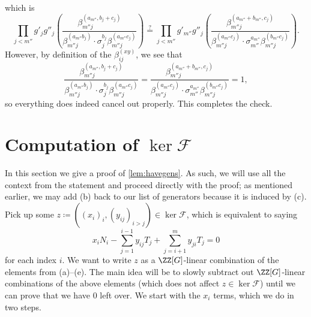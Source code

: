 \documentclass{article}
\numberwithin{equation}{section}
\begin{document}
which is
\[\prod_{j<m''}
g'_jg''_j\left(\frac{\beta_{m''j}^{(a_{m''},b_j+c_j)}}
{\beta_{m''j}^{(a_{m''}b_j)}\cdot
\sigma_j^{b_j}\beta_{m''j}^{(a_{m''}c_j)}}\right)
\stackrel?=\prod_{j<m''}
g'_{m''}g''_j\left(\frac{\beta_{m''j}^{(a_{m''}+b_{m''},c_j)}}
{\beta_{m''j}^{(a_{m''}c_j)}\cdot
\sigma_{m''}^{a_{m''}}\beta_{m''j}^{(b_{m''}c_j)}}\right).\]
However, by definition of the $\beta_{ij}^{(xy)}$, we see that
\[\frac{\beta_{m''j}^{(a_{m''},b_j+c_j)}}
{\beta_{m''j}^{(a_{m''}b_j)}\cdot
\sigma_j^{b_j}\beta_{m''j}^{(a_{m''}c_j)}}=\frac{\beta_{m''j}^{(a_{m''}+b_{m''},c_j)}}
{\beta_{m''j}^{(a_{m''}c_j)}\cdot
\sigma_{m''}^{a_{m''}}\beta_{m''j}^{(b_{m''}c_j)}}=1,\]
so everything does indeed cancel out properly. This completes the check.

\section{Computation of \texorpdfstring{$\ker\mathcal F$}{ker F}} \label{sec:havegensproof}
In this section we give a proof of \autoref{lem:havegens}. As such, we will use all the context from the statement and proceed directly with the proof; as mentioned earlier, we may add (b) back to our list of generators because it is induced by (c). Pick up some $z\coloneqq((x_i)_i,(y_{ij})_{i>j})\in\ker\mathcal F$, which is equivalent to saying
\[x_iN_i-\sum_{j=1}^{i-1}y_{ij}T_j+\sum_{j=i+1}^my_{ji}T_j=0\]
for each index $i$. We want to write $z$ as a $\ZZ[G]$-linear combination of the elements from (a)--(e). The main idea will be to slowly subtract out $\ZZ[G]$-linear combinations of the above elements (which does not affect $z\in\ker\mathcal F$) until we can prove that we have $0$ left over. We start with the $x_i$ terms, which we do in two steps.
\end{document}
